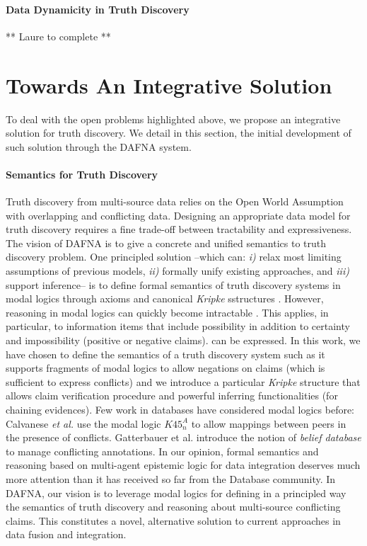 \documentclass[prodmode,acmtecs]{acmsmall} %
\begin{document}
\paragraph*{Data Dynamicity in  Truth Discovery} 
** Laure to complete **

\section{Towards An Integrative Solution}
To deal with the open problems highlighted above, we propose an integrative solution for truth discovery.
We detail in this section, the initial development of such solution through the DAFNA system.

\paragraph*{Semantics for Truth Discovery} 

Truth discovery from multi-source data relies on the Open World Assumption with overlapping and conflicting data.
Designing an appropriate data model for truth discovery requires a fine trade-off between tractability and expressiveness. 
The vision of DAFNA is to give a concrete and unified semantics to  truth discovery problem. One principled solution --which 
can: {\it i)} relax most limiting assumptions of previous models, {\it ii)} formally unify existing approaches, and {\it iii)}
support inference-- is to define formal semantics of truth discovery systems in modal logics through axioms and canonical {\it Kripke}
sstructures \cite{GorankoOtto06}. However, reasoning in modal logics can quickly become intractable \cite{Gottlob92}. This applies, in
particular, to information items that include possibility in addition to certainty and impossibility (positive or negative claims). 
can be expressed. 
In this work, we have chosen to define the semantics of a truth discovery system such as it supports fragments of modal logics to allow
negations on claims (which is sufficient to express conflicts) and we introduce a particular {\it Kripke} structure that allows claim 
verification procedure and powerful inferring functionalities (for chaining evidences). Few work in databases have considered modal logics
before: 
Calvanese {\it et al.} \cite{CalvaneseGLLR08} use the modal logic $K45^A_n$ to allow mappings between peers in the presence of conflicts. 
Gatterbauer et al. \cite{GatterbauerBKS09} introduce the notion of {\it belief database} to manage conflicting annotations. In our opinion, 
formal semantics and reasoning based on multi-agent epistemic logic for data integration deserves much more attention than it has received 
so far from the Database community. In DAFNA, our vision is to leverage modal logics for defining in a principled way the semantics of truth 
discovery and reasoning about multi-source conflicting claims. This constitutes a novel, alternative solution to current approaches in data 
fusion and integration. 
\end{document}
